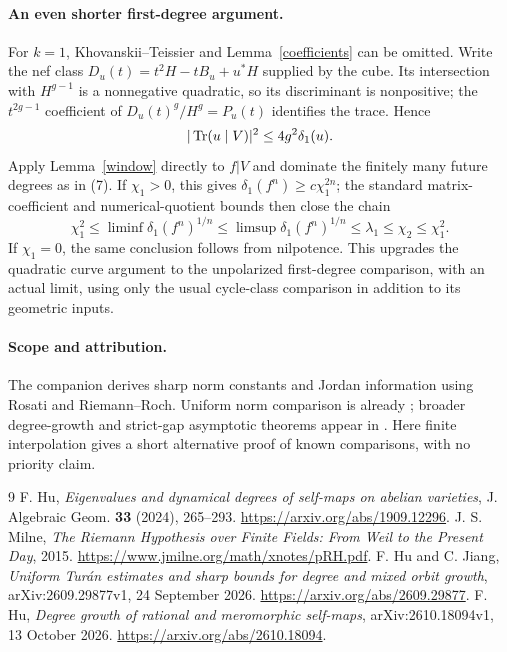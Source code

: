 \documentclass[11pt]{article}
\begin{document}
\paragraph{An even shorter first-degree argument.}
For $k=1$, Khovanskii--Teissier and Lemma~\ref{coefficients} can be
omitted. Write the nef class
$D_u(t)=t^2H-tB_u+u^*H$ supplied by the cube. Its intersection with
$H^{g-1}$ is a nonnegative quadratic, so its discriminant is nonpositive;
the $t^{2g-1}$
coefficient of $D_u(t)^g/H^g=P_u(t)$ identifies the trace. Hence
\[
 |\operatorname{Tr}(u\mid V)|^2\le4g^2\delta_1(u).
\]
Apply Lemma~\ref{window} directly to $f|V$ and dominate the finitely
many future degrees as in (7). If $\chi_1>0$, this gives
$\delta_1(f^n)\ge c\chi_1^{2n}$; the standard matrix-coefficient and
numerical-quotient bounds then close the chain
\[
 \chi_1^2\le\liminf\delta_1(f^n)^{1/n}
 \le\limsup\delta_1(f^n)^{1/n}
 \le\lambda_1\le\chi_2\le\chi_1^2.
\]
If $\chi_1=0$, the same conclusion follows from nilpotence. This
upgrades the quadratic curve argument to the unpolarized first-degree
comparison, with an actual limit, using only the usual cycle-class
comparison in addition to its geometric inputs.

\paragraph{Scope and attribution.}
The companion derives sharp norm constants and Jordan information using
Rosati and Riemann--Roch. Uniform norm comparison is already
\cite[Corollary 5.6]{Hu}; broader degree-growth and strict-gap asymptotic
theorems appear in \cite{HJ,HuRecent}. Here finite interpolation gives a
short alternative proof of known comparisons, with no priority claim.

\begin{thebibliography}{9}\small
{} F. Hu, \emph{Eigenvalues and dynamical degrees of self-maps
on abelian varieties}, J. Algebraic Geom. \textbf{33} (2024), 265--293.
\url{https://arxiv.org/abs/1909.12296}.
 J. S. Milne, \emph{The Riemann Hypothesis over Finite
Fields: From Weil to the Present Day}, 2015.
\url{https://www.jmilne.org/math/xnotes/pRH.pdf}.
 F. Hu and C. Jiang, \emph{Uniform Tur\'an estimates and sharp
bounds for degree and mixed orbit growth}, arXiv:2609.29877v1,
24 September 2026. \url{https://arxiv.org/abs/2609.29877}.
 F. Hu, \emph{Degree growth of rational and meromorphic
self-maps}, arXiv:2610.18094v1, 13 October 2026.
\url{https://arxiv.org/abs/2610.18094}.
\end{thebibliography}
\end{document}
